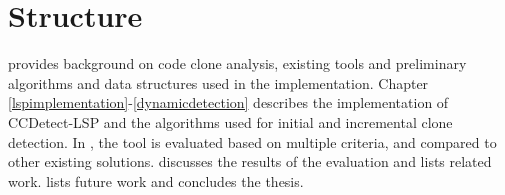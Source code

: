 \section{Structure}

 provides background on code clone analysis, existing tools and
preliminary algorithms and data structures used in the implementation. Chapter
\ref{lspimplementation}-\ref{dynamicdetection} describes the implementation of
CCDetect-LSP and the algorithms used for initial and incremental clone detection. In
, the tool is evaluated based on multiple criteria, and compared to other
existing solutions.  discusses the results of the evaluation and lists related
work.  lists future work and concludes the thesis.
